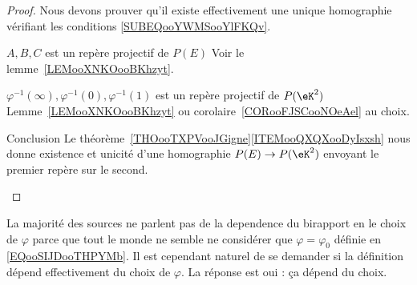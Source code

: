 \begin{proof}
    Nous devons prouver qu'il existe effectivement une unique homographie vérifiant les conditions \eqref{SUBEQooYWMSooYlFKQv}.
    \begin{subproof}
        \item[\( A,B,C\) est un repère projectif de \( P(E)\)]
            Voir le lemme~\ref{LEMooXNKOooBKhzyt}.

        \item[\(   \varphi^{-1}(\infty), \varphi^{-1}(0), \varphi^{-1}(1)  \) est un repère projectif de \( P(\eK^2)\)]
            Lemme~\ref{LEMooXNKOooBKhzyt} ou corolaire~\ref{CORooFJSCooNOeAel} au choix.
        \item[Conclusion]
            Le théorème~\ref{THOooTXPVooJGigne}\ref{ITEMooQXQXooDyIsxsh} nous donne existence et unicité d'une homographie \( P(E)\to P(\eK^2) \) envoyant le premier repère sur le second.
    \end{subproof}
\end{proof}

\begin{remark}
    La majorité des sources ne parlent pas de la dependence du birapport en le choix de \( \varphi\) parce que tout le monde ne semble ne considérer que \( \varphi=\varphi_0\) définie en \eqref{EQooSIJDooTHPYMb}. Il est cependant naturel de se demander si la définition dépend effectivement du choix de \( \varphi\). La réponse est oui : ça dépend du choix.
\end{remark}

